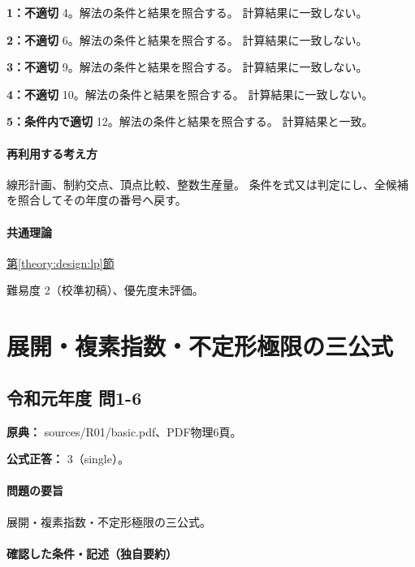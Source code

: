 \noindent\textbf{1：不適切} 4。解法の条件と結果を照合する。 計算結果に一致しない。\par

\noindent\textbf{2：不適切} 6。解法の条件と結果を照合する。 計算結果に一致しない。\par

\noindent\textbf{3：不適切} 9。解法の条件と結果を照合する。 計算結果に一致しない。\par

\noindent\textbf{4：不適切} 10。解法の条件と結果を照合する。 計算結果に一致しない。\par

\noindent\textbf{5：条件内で適切} 12。解法の条件と結果を照合する。 計算結果と一致。\par

\paragraph{再利用する考え方} 線形計画、制約交点、頂点比較、整数生産量。 条件を式又は判定にし、全候補を照合してその年度の番号へ戻す。

\paragraph{共通理論} \hyperref[theory:design:lp]{第\ref*{theory:design:lp}節}

\par 難易度 2（校準初稿）、優先度未評価。

\section{展開・複素指数・不定形極限の三公式}

\subsection{令和元年度 問1-6}
\label{q:r01-reg-basic-1-6}

\noindent\textbf{原典：} sources/R01/basic.pdf、PDF物理6頁。

\textbf{公式正答：} 3（single）。

\paragraph{問題の要旨} 展開・複素指数・不定形極限の三公式。

\paragraph{確認した条件・記述（独自要約）}\mbox{}\par

